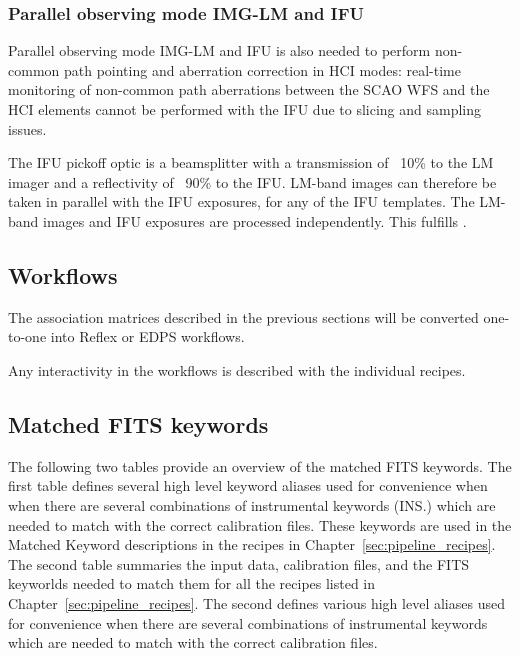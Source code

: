 \subsubsection{Parallel observing mode IMG-LM and IFU}\label{sssec:parallellmifu}
Parallel observing mode IMG-LM and IFU is also needed to perform non-common path pointing and aberration correction in \ac{HCI} modes:
real-time monitoring of non-common path aberrations between the \ac{SCAO} \ac{WFS} and the \ac{HCI} elements cannot be performed with the \ac{IFU} due to slicing and sampling issues.

The IFU pickoff optic is a beamsplitter with a transmission of ~10\% to the LM imager and a reflectivity of ~90\% to the IFU. %
LM-band images can therefore be taken in parallel with the IFU exposures, for any of the IFU templates.
The LM-band images and IFU exposures are processed independently.
This fulfills .


\subsection{Workflows}
The association matrices described in the previous sections will be converted one-to-one into Reflex or \ac{EDPS} workflows.

Any interactivity in the workflows is described with the individual recipes.


\subsection{Matched FITS keywords}

The following two tables provide an overview of the matched FITS
keywords. The first table defines several high level keyword
aliases used for convenience when  when there are several combinations
of instrumental keywords (INS.) which are needed to match with the correct
calibration files. These keywords are used in the Matched Keyword
descriptions in the recipes in Chapter~\ref{sec:pipeline_recipes}. The
second table summaries the input data, calibration files, and the FITS
keyworlds needed to match them for all the recipes listed in
Chapter~\ref{sec:pipeline_recipes}. The second defines various high
level aliases used for convenience when there are several combinations
of instrumental keywords which are needed to match with the correct
calibration files.


